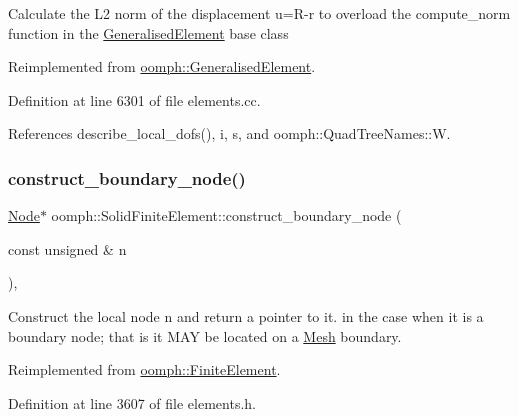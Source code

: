 Calculate the L2 norm of the displacement u=R-\/r to overload the compute\+\_\+norm function in the \hyperlink{classoomph_1_1GeneralisedElement}{Generalised\+Element} base class 

Reimplemented from \hyperlink{classoomph_1_1GeneralisedElement_af2025a472df6752a946739da58e7fb37}{oomph\+::\+Generalised\+Element}.



Definition at line 6301 of file elements.\+cc.



References describe\+\_\+local\+\_\+dofs(), i, s, and oomph\+::\+Quad\+Tree\+Names\+::W.

\mbox{\label{classoomph_1_1SolidFiniteElement_acb1c7eeb1eb0db65ae7578508fa1e272}} 
\subsubsection{\texorpdfstring{construct\+\_\+boundary\+\_\+node()}{construct\_boundary\_node()}\hspace{0.1cm}{\footnotesize\ttfamily [1/2]}}
{\footnotesize\ttfamily \hyperlink{classoomph_1_1Node}{Node}$\ast$ oomph\+::\+Solid\+Finite\+Element\+::construct\+\_\+boundary\+\_\+node (\begin{DoxyParamCaption}\item[{const unsigned \&}]{n }\end{DoxyParamCaption})\hspace{0.3cm}{\ttfamily [inline]}, {\ttfamily [virtual]}}



Construct the local node n and return a pointer to it. in the case when it is a boundary node; that is it M\+AY be located on a \hyperlink{classoomph_1_1Mesh}{Mesh} boundary. 



Reimplemented from \hyperlink{classoomph_1_1FiniteElement_ac6f9b6635daf3bfca24adb2c22c8dc81}{oomph\+::\+Finite\+Element}.



Definition at line 3607 of file elements.\+h.

\mbox{\label{classoomph_1_1SolidFiniteElement_a94e0209092e12bb72e6d21c1e560bc7c}} 
